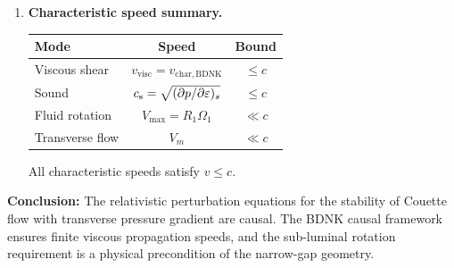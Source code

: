 \begin{causalitycheck}
\begin{enumerate}
\item \textbf{Characteristic speed summary.}
  \begin{center}
  \begin{tabular}{lcc}
  \hline
  Mode & Speed & Bound \\
  \hline
  Viscous shear & $v_{\mathrm{visc}}
    = v_{\mathrm{char,BDNK}}$ & $\leqslant c$ \\
  Sound & $c_{\mathrm{s}} = \sqrt{(\partial p/\partial\varepsilon)_s}$ & $\leqslant c$ \\
  Fluid rotation & $V_{\max} = R_1\Omega_1$ & $\ll c$ \\
  Transverse flow & $V_m$ & $\ll c$ \\
  \hline
  \end{tabular}
  \end{center}
  All characteristic speeds satisfy $v \leqslant c$.  \checkmark
\end{enumerate}

\textbf{Conclusion:}  The relativistic perturbation equations for
the stability of Couette flow with transverse pressure gradient are
causal.  The BDNK causal framework ensures finite viscous
propagation speeds, and the sub-luminal rotation requirement is a
physical precondition of the narrow-gap geometry.
\end{causalitycheck}
